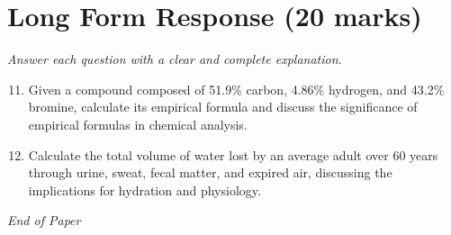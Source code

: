 \documentclass[12pt]{article}
\begin{document}
\section*{Long Form Response (20 marks)}
\textit{Answer each question with a clear and complete explanation.}
\begin{enumerate}[label=\arabic*.]
\setcounter{enumi}{10}
\item Given a compound composed of 51.9\% carbon, 4.86\% hydrogen, and 43.2\% bromine, calculate its empirical formula and discuss the significance of empirical formulas in chemical analysis.
\item Calculate the total volume of water lost by an average adult over 60 years through urine, sweat, fecal matter, and expired air, discussing the implications for hydration and physiology.
\end{enumerate}

\vfill
\noindent\textit{End of Paper}
\end{document}
